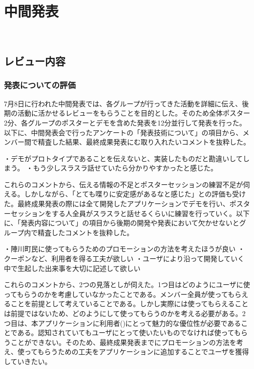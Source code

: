 \chapter{中間発表}
​
\section{レビュー内容}%
\subsection{発表についての評価}%
7月8日に行われた中間発表では、各グループが行ってきた活動を詳細に伝え、後期の活動に活かせるレビューをもらうことを目的とした。そのため全体ポスター2分、各グループのポスターとデモを含めた発表を12分並行して発表を行った。以下に、中間発表会で行ったアンケートの「発表技術について」の項目から、メンバー間で精査した結果、最終成果発表にむ取り入れたいコメントを抜粋した。

    ・デモがプロトタイプであることを伝えないと、実装したものだと勘違いしてしまう。
    ・もう少しスラスラ話せていたら分かりやすかったと感じた。

    これらのコメントから、伝える情報の不足とポスターセッションの練習不足が伺える。しかしながら、「とても喋りに安定感があるなと感じた」との評価も受けた。最終成果発表の際には全て開発したアプリケーションでデモを行い、ポスターセッションをする人全員がスラスラと話せるくらいに練習を行っていく。以下に、「発表内容について」の項目から後期の開発や発表において欠かせないとグループ内で精査したコメントを抜粋した。

    ・陣川町民に使ってもらうためのプロモーションの方法を考えたほうが良い
    ・クーポンなど、利用者を得る工夫が欲しい
    ・ユーザにより沿って開発していく中で生起した出来事を大切に記述して欲しい

    これらのコメントから、2つの見落としが伺えた。1つ目はどのようにユーザに使ってもらうのかを考慮していなかったことである。メンバー全員が使ってもらえることを前提として考えていることである。しかし実際には使ってもらえることは前提ではないため、どのようにして使ってもらうのかを考える必要がある。2つ目は、本アプリケーションに利用者()にとって魅力的な優位性が必要であることである。認知されていてもユーザにとって使いたいものでなければ使ってもらうことができない。そのため、最終成果発表までにプロモーションの方法を考え、使ってもらうための工夫をアプリケーションに追加することでユーザを獲得していきたい。
